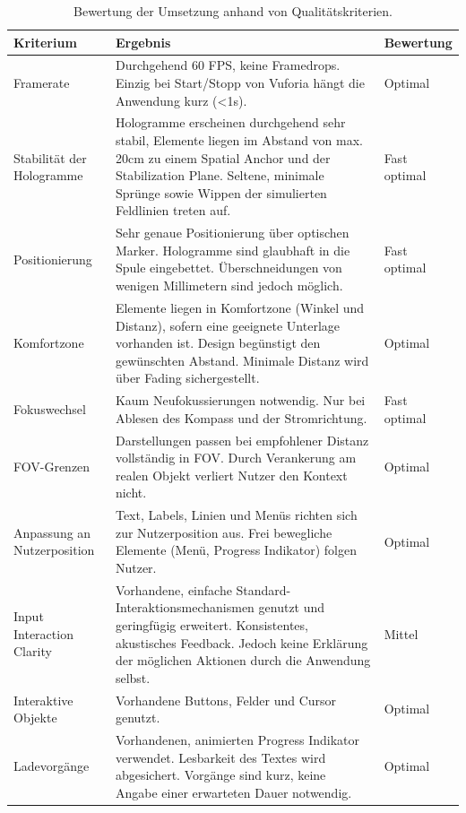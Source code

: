 \begin{landscape}
	\bgroup
	\setlength\extrarowheight{-2pt}
	\def\arraystretch{1.8}
	\begin{table}
		\centering
		\begin{tabular}{m{2.3cm}|m{15.5cm}|m{2cm}}
			Kriterium & Ergebnis & Bewertung\\
			\hline
			\hline
			Framerate & Durchgehend 60 FPS, keine Framedrops. Einzig bei Start/Stopp von Vuforia hängt die Anwendung kurz (<1s). & Optimal\\
			\hline
			Stabilität der Hologramme & Hologramme erscheinen durchgehend sehr stabil, Elemente liegen im Abstand von max. 20cm zu einem Spatial Anchor und der Stabilization Plane. Seltene, minimale Sprünge sowie Wippen der simulierten Feldlinien treten auf. & Fast optimal\\
			\hline
			Positionierung & Sehr genaue Positionierung über optischen Marker. Hologramme sind glaubhaft in die Spule eingebettet. Überschneidungen von wenigen Millimetern sind jedoch möglich. & Fast optimal\\
			\hline
			Komfortzone & Elemente liegen in Komfortzone (Winkel und Distanz), sofern eine geeignete Unterlage vorhanden ist. Design begünstigt den gewünschten Abstand. Minimale Distanz wird über Fading sichergestellt. & Optimal\\
			\hline
			Fokuswechsel & Kaum Neufokussierungen notwendig. Nur bei Ablesen des Kompass und der Stromrichtung. & Fast optimal\\
			\hline
			FOV-Grenzen & Darstellungen passen bei empfohlener Distanz vollständig in FOV. Durch Verankerung am realen Objekt verliert Nutzer den Kontext nicht. & Optimal\\
			\hline
			Anpassung an Nutzerposition & Text, Labels, Linien und Menüs richten sich zur Nutzerposition aus. Frei bewegliche Elemente (Menü, Progress Indikator) folgen Nutzer. & Optimal\\
			\hline
			Input Interaction Clarity & Vorhandene, einfache Standard-Interaktionsmechanismen genutzt und geringfügig erweitert. Konsistentes, akustisches Feedback. Jedoch keine Erklärung der möglichen Aktionen durch die Anwendung selbst. & Mittel\\
			\hline
			Interaktive Objekte & Vorhandene Buttons, Felder und Cursor genutzt. & Optimal\\
			\hline
			Ladevorgänge & Vorhandenen, animierten Progress Indikator verwendet. Lesbarkeit des Textes wird abgesichert. Vorgänge sind kurz, keine Angabe einer erwarteten Dauer notwendig. & Optimal\\
		\end{tabular}\caption{\label{tab:tech_results} Bewertung der Umsetzung anhand von Qualitätskriterien.}
	\end{table}
	\egroup
\end{landscape}

